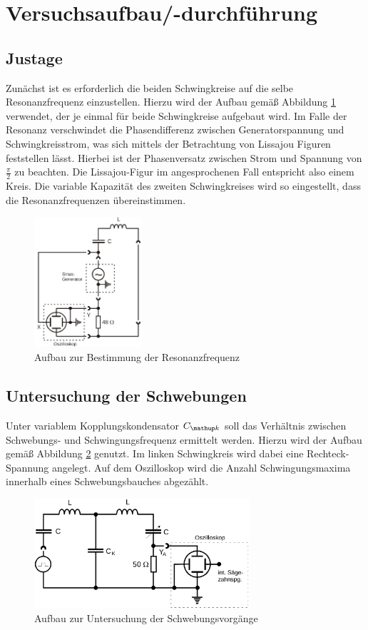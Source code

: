 \section{Versuchsaufbau/-durchführung}
\subsection{Justage}
Zunächst ist es erforderlich die beiden Schwingkreise auf die selbe Resonanzfrequenz einzustellen.
Hierzu wird der Aufbau gemäß Abbildung \ref{fig: resonanzfrequenz} verwendet, der je einmal
für beide Schwingkreise aufgebaut wird. Im Falle der Resonanz verschwindet die Phasendifferenz
zwischen Generatorspannung und Schwingkreisstrom, was sich mittels der Betrachtung von Lissajou
Figuren feststellen lässt. Hierbei ist der Phasenversatz zwischen Strom und Spannung von $\frac{\pi}{2}$
zu beachten. Die Lissajou-Figur im angesprochenen Fall entspricht also einem Kreis.
Die variable Kapazität des zweiten Schwingkreises wird so eingestellt, dass
die Resonanzfrequenzen übereinstimmen.
\begin{figure}
  \centering
  \includegraphics[width = 4cm]{pics/aufbau_resonanzfrequenz.png}
  \caption{Aufbau zur Bestimmung der Resonanzfrequenz \cite{anleitung355}}
  \label{fig: resonanzfrequenz}
\end{figure}

\subsection{Untersuchung der Schwebungen}
Unter variablem Kopplungskondensator $C\ua{k}$ soll das Verhältnis zwischen Schwebungs- und Schwingungsfrequenz ermittelt werden.
Hierzu wird der Aufbau gemäß Abbildung \ref{fig: schwebung} genutzt. Im linken Schwingkreis wird dabei eine Rechteck-Spannung
angelegt. Auf dem Oszilloskop wird die Anzahl Schwingungsmaxima innerhalb eines Schwebungsbauches abgezählt.

\begin{figure}
  \centering
  \includegraphics[width = 8cm]{pics/aufbau_schwebung.png}
  \caption{Aufbau zur Untersuchung der Schwebungsvorgänge \cite{anleitung355}}
  \label{fig: schwebung}
\end{figure}

